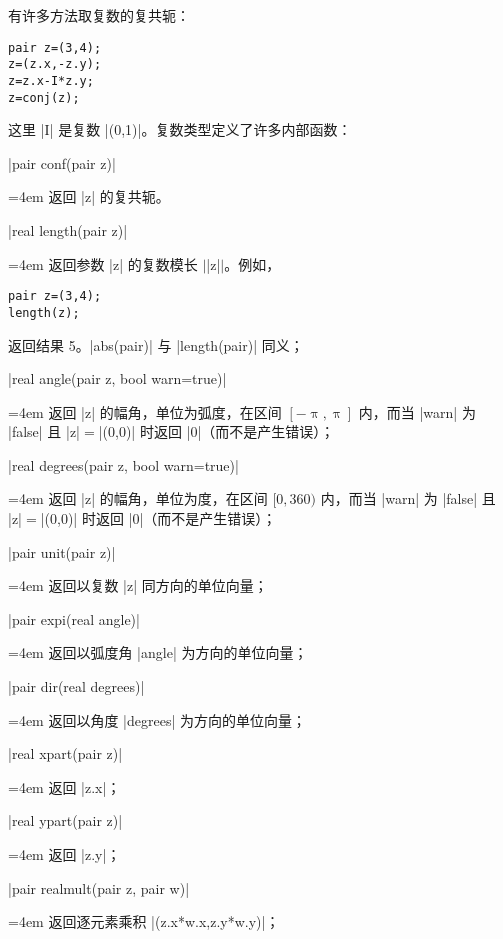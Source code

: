 \documentclass{ctexbook}
\makeatletter
\newenvironment{funclist}{\trivlist
  \parindent=0pt
\item[]
  \def\item{\medskip\par\leftskip=0pt}
  \def\go{\par\leftskip=4em}}
{\endtrivlist}
\newenvironment{typelist}{\itemize
  \let\old@item\@item
  \def\@item[##1]{\expandafter\old@item[\ttfamily\color{type!50!black}##1]}}
{\enditemize}
\makeatother
\begin{document}
\begin{typelist}
有许多方法取复数的复共轭：
\begin{lstlisting}
pair z=(3,4);
z=(z.x,-z.y);
z=z.x-I*z.y;
z=conj(z);
\end{lstlisting}
这里 |I| 是复数 |(0,1)|。复数类型定义了许多内部函数：
\begin{funclist}
\item |pair conf(pair z)| \go
  返回 |z| 的复共轭。

\item |real length(pair z)| \go
  返回参数 |z| 的复数模长 $\vert$|z|$\vert$。例如，
\begin{lstlisting}
pair z=(3,4);
length(z);
\end{lstlisting}
  返回结果 5。|abs(pair)| 与 |length(pair)| 同义；

\item |real angle(pair z, bool warn=true)| \go
  返回 |z| 的幅角，单位为弧度，在区间 $[-\uppi, \uppi]$ 内，而当 |warn| 为
  |false| 且 |z|${}={}$|(0,0)| 时返回 |0|（而不是产生错误）；

\item |real degrees(pair z, bool warn=true)| \go
  返回 |z| 的幅角，单位为度，在区间 $[0,360)$ 内，而当 |warn| 为 |false| 且
  |z|${}={}$|(0,0)| 时返回 |0|（而不是产生错误）；

\item |pair unit(pair z)| \go
  返回以复数 |z| 同方向的单位向量；

\item |pair expi(real angle)| \go
  返回以弧度角 |angle| 为方向的单位向量；

\item |pair dir(real degrees)| \go
  返回以角度 |degrees| 为方向的单位向量；

\item |real xpart(pair z)| \go
  返回 |z.x|；

\item |real ypart(pair z)| \go
  返回 |z.y|；

\item |pair realmult(pair z, pair w)| \go
  返回逐元素乘积 |(z.x*w.x,z.y*w.y)|；


\end{funclist}
\end{typelist}
\end{document}
